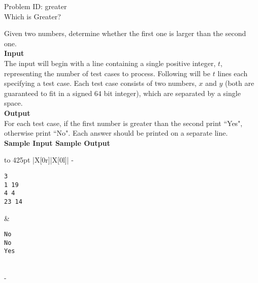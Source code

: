 \documentclass[a4paper,11pt]{article}
\begin{document}
\setcounter{page}{2}

\begin{center}
   {\Huge Problem ID: greater}\vspace{2 mm} \\			%
   {\huge Which is Greater?}\vspace{2 mm} \\		%
\end{center}
Given two numbers, determine whether the first one is larger than the second one.
\vspace{7mm}\\
\large{\bf{Input}}\vspace{2mm}\\
The input will begin with a line containing a single positive integer, $t$, representing the number of test cases to process. Following will be $t$ lines each specifying a test case. Each test case consists of two numbers, $x$ and $y$ (both are guaranteed to fit in a signed $64$ bit integer), which are separated by a single space.
\vspace{3mm}\\
\large{\bf{Output}}\vspace{2mm}\\
For each test case, if the first number is greater than the second print ``Yes", otherwise print ``No". Each answer should be printed on a separate line.
\vspace{5mm}\\
\bf{Sample Input} \hspace{44mm} \bf{Sample Output}\vspace{1mm}\\
\begin{tabu*} to 425pt {|X[0r]|X[0l]|}
\tabucline-
\vspace{-\baselineskip} %
\begin{Verbatim}
3
1 19
4 4
23 14
\end{Verbatim}
&
\vspace{-\baselineskip} %
\begin{Verbatim}
No
No
Yes
\end{Verbatim}
\\
\tabucline-
\end{tabu*}
\end{document}
